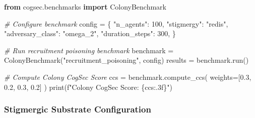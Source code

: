 \documentclass[
]{article}
\newenvironment{Shaded}{}{}
\newcommand{\BuiltInTok}[1]{\textcolor[rgb]{0.00,0.50,0.00}{#1}}
\newcommand{\CommentTok}[1]{\textcolor[rgb]{0.38,0.63,0.69}{\textit{#1}}}
\newcommand{\DecValTok}[1]{\textcolor[rgb]{0.25,0.63,0.44}{#1}}
\newcommand{\FloatTok}[1]{\textcolor[rgb]{0.25,0.63,0.44}{#1}}
\newcommand{\ImportTok}[1]{\textcolor[rgb]{0.00,0.50,0.00}{\textbf{#1}}}
\newcommand{\NormalTok}[1]{#1}
\newcommand{\OperatorTok}[1]{\textcolor[rgb]{0.40,0.40,0.40}{#1}}
\newcommand{\SpecialCharTok}[1]{\textcolor[rgb]{0.25,0.44,0.63}{#1}}
\newcommand{\SpecialStringTok}[1]{\textcolor[rgb]{0.73,0.40,0.53}{#1}}
\newcommand{\StringTok}[1]{\textcolor[rgb]{0.25,0.44,0.63}{#1}}
\begin{document}
\begin{Shaded}
\begin{Highlighting}[]
\ImportTok{from}\NormalTok{ cogsec.benchmarks }\ImportTok{import}\NormalTok{ ColonyBenchmark}

\CommentTok{\# Configure benchmark}
\NormalTok{config }\OperatorTok{=}\NormalTok{ \{}
    \StringTok{"n\_agents"}\NormalTok{: }\DecValTok{100}\NormalTok{,}
    \StringTok{"stigmergy"}\NormalTok{: }\StringTok{"redis"}\NormalTok{,}
    \StringTok{"adversary\_class"}\NormalTok{: }\StringTok{"omega\_2"}\NormalTok{,}
    \StringTok{"duration\_steps"}\NormalTok{: }\DecValTok{300}\NormalTok{,}
\NormalTok{\}}

\CommentTok{\# Run recruitment poisoning benchmark}
\NormalTok{benchmark }\OperatorTok{=}\NormalTok{ ColonyBenchmark(}\StringTok{"recruitment\_poisoning"}\NormalTok{, config)}
\NormalTok{results }\OperatorTok{=}\NormalTok{ benchmark.run()}

\CommentTok{\# Compute Colony CogSec Score}
\NormalTok{ccs }\OperatorTok{=}\NormalTok{ benchmark.compute\_ccs(}
\NormalTok{    weights}\OperatorTok{=}\NormalTok{[}\FloatTok{0.3}\NormalTok{, }\FloatTok{0.2}\NormalTok{, }\FloatTok{0.3}\NormalTok{, }\FloatTok{0.2}\NormalTok{]}
\NormalTok{)}
\BuiltInTok{print}\NormalTok{(}\SpecialStringTok{f"Colony CogSec Score: }\SpecialCharTok{\{}\NormalTok{ccs}\SpecialCharTok{:.3f\}}\SpecialStringTok{"}\NormalTok{)}
\end{Highlighting}
\end{Shaded}

\subsubsection{Stigmergic Substrate
Configuration}\label{stigmergic-substrate-configuration}
\end{document}
